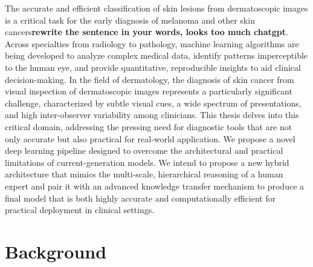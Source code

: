\noindent The accurate and efficient classification of skin lesions from dermatoscopic images is a critical task for the early diagnosis of melanoma and other skin cancers\textbf{rewrite the sentence in your words, looks too much chatgpt}. Across specialties from radiology to pathology, machine learning algorithms are being developed to analyze complex medical data, identify patterns imperceptible to the human eye, and provide quantitative, reproducible insights to aid clinical decision-making. In the field of dermatology, the diagnosis of skin cancer from visual inspection of dermatoscopic images represents a particularly significant challenge, characterized by subtle visual cues, a wide spectrum of presentations, and high inter-observer variability among clinicians. This thesis delves into this critical domain, addressing the pressing need for diagnostic tools that are not only accurate but also practical for real-world application. We propose a novel deep learning pipeline designed to overcome the architectural and practical limitations of current-generation models. We intend to propose a new hybrid architecture that mimics the multi-scale, hierarchical reasoning of a human expert and pair it with an advanced knowledge transfer mechanism to produce a final model that is both highly accurate and computationally efficient for practical deployment in clinical settings.


\section{Background}\label{Chapter_1_Motivation}


